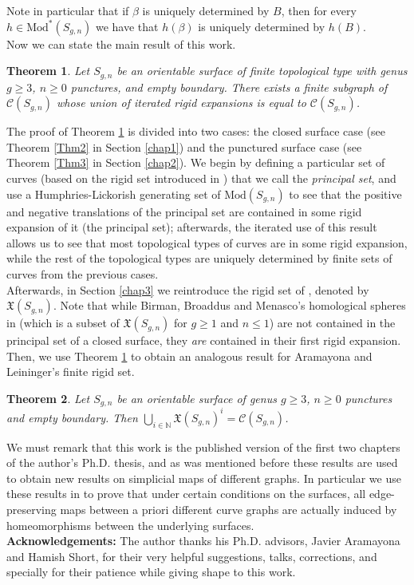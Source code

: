 \documentclass[twoside,11pt,a4paper]{article}
\newtheorem{Theo}{Theorem}
\newcommand*{\ccomp}[1]{\mathcal{C}(#1)}
\newcommand*{\Mod}[1]{\mathrm{Mod}(#1)}
\newcommand*{\EMod}[1]{\mathrm{Mod}^{*}(#1)}
\newcommand*{\nat}{\mathbb{N}}
\newcommand*{\X}{\mathfrak{X}}
\begin{document}
\indent Note in particular that if $\beta$ is uniquely determined by $B$, then for every $h \in \EMod{S_{g,n}}$ we have that $h(\beta)$ is uniquely determined by $h(B)$.\\
\indent Now we can state the main result of this work.
\begin{Theo}\label{TheoA}
 Let $S_{g,n}$ be an orientable surface of finite topological type with genus $g \geq 3$, $n \geq 0$ punctures, and empty boundary. There exists a finite subgraph of $\ccomp{S_{g,n}}$ whose union of iterated rigid expansions is equal to $\ccomp{S_{g,n}}$.
\end{Theo}
\indent The proof of Theorem \ref{TheoA} is divided into two cases: the closed surface case (see Theorem \ref{Thm2} in Section \ref{chap1}) and the punctured surface case (see Theorem \ref{Thm3} in Section \ref{chap2}). We begin by defining a particular set of curves (based on the rigid set introduced in \cite{Ara1}) that we call the \textit{principal set}, and use a Humphries-Lickorish generating set of $\Mod{S_{g,n}}$ to see that the positive and negative translations of the principal set are contained in some rigid expansion of it (the principal set); afterwards, the iterated use of this result allows us to see that most topological types of curves are in some rigid expansion, while the rest of the topological types are uniquely determined by finite sets of curves from the previous cases.\\
\indent Afterwards, in Section \ref{chap3} we reintroduce the rigid set of \cite{Ara1}, denoted by $\X(S_{g,n})$. Note that while Birman, Broaddus and Menasco's homological spheres in \cite{Broaddus} (which is a subset of $\X(S_{g,n})$ for $g \geq 1$ and $n \leq 1$) are not contained in the principal set of a closed surface, they \textit{are} contained in their first rigid expansion. Then, we use Theorem \ref{TheoA} to obtain an analogous result for Aramayona and Leininger's finite rigid set.
\begin{Theo}\label{Xexhausts}
 Let $S_{g,n}$ be an orientable surface of genus $g \geq 3$, $n \geq 0$ punctures and empty boundary. Then $\bigcup_{i \in \nat} \X(S_{g,n})^{i} = \ccomp{S_{g,n}}$.
\end{Theo}
\indent We must remark that this work is the published version of the first two chapters of the author's Ph.D. thesis, and as was mentioned before these results are used to obtain new results on simplicial maps of different graphs. In particular we use these results in \cite{JHH2} to prove that under certain conditions on the surfaces, all edge-preserving maps between a priori different curve graphs are actually induced by homeomorphisms between the underlying surfaces.\\[0.3cm]
\textbf{Acknowledgements:} The author thanks his Ph.D. advisors, Javier Aramayona and Hamish Short, for their very helpful suggestions, talks, corrections, and specially for their patience while giving shape to this work.
\end{document}
